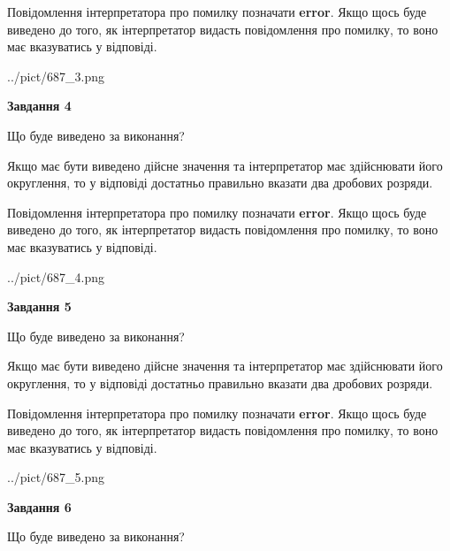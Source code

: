 \documentclass[12pt, ukrainian]{article}
\begin{document}
{\begin {Large}
Повідомлення інтерпретатора про помилку позначати \textbf{error}.
Якщо щось буде виведено до того, як інтерпретатор видасть повідомлення про помилку, 
то воно має вказуватись у відповіді. \par

\begin{center}
	{../pict/687_3.png}
\end{center}
\newpage

{\begin {center}\textbf{Завдання 4}\end {center}}\par
Що буде виведено за виконання? \par

Якщо має бути виведено дійсне значення та інтерпретатор має здійснювати його округлення, 
то у відповіді достатньо правильно вказати два дробових розряди.

Повідомлення інтерпретатора про помилку позначати \textbf{error}.
Якщо щось буде виведено до того, як інтерпретатор видасть повідомлення про помилку, 
то воно має вказуватись у відповіді. \par

\begin{center}
	{../pict/687_4.png}
\end{center}
\newpage

{\begin {center}\textbf{Завдання 5}\end {center}}\par
Що буде виведено за виконання? \par

Якщо має бути виведено дійсне значення та інтерпретатор має здійснювати його округлення, 
то у відповіді достатньо правильно вказати два дробових розряди.

Повідомлення інтерпретатора про помилку позначати \textbf{error}.
Якщо щось буде виведено до того, як інтерпретатор видасть повідомлення про помилку, 
то воно має вказуватись у відповіді. \par

\begin{center}
	{../pict/687_5.png}
\end{center}
\newpage

{\begin {center}\textbf{Завдання 6}\end {center}}\par
Що буде виведено за виконання? \par


\end{Large}}
\end{document}
